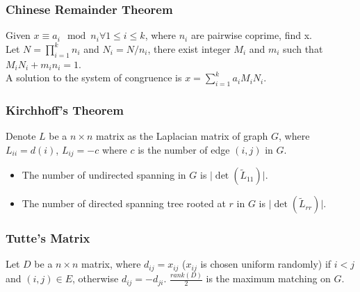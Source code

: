 \subsubsection{Chinese Remainder Theorem}
Given $x \equiv a_i \mod n_i \forall 1 \leq i \leq k$, where $n_i$ are pairwise coprime, find x. \\
Let $N = \prod_{i = 1}^{k}{n_i}$ and $N_i = N / n_i$, there exist integer $M_i$ and $m_i$ such that $M_iN_i + m_in_i = 1$. \\
A solution to the system of congruence is $x = \sum_{i = 1}^{k}{a_iM_iN_i}$. 

\subsubsection{Kirchhoff's Theorem}
Denote $L$ be a $n \times n$ matrix as the Laplacian matrix of graph $G$, where $L_{ii} = d(i)$, $L_{ij} = -c$ where $c$ is the number of edge $(i, j)$ in $G$.
\begin{itemize}
    \item The number of undirected spanning in $G$ is $\lvert \det(\tilde{L}_{11}) \rvert$.
    \item The number of directed spanning tree rooted at $r$ in $G$ is $\lvert \det(\tilde{L}_{rr}) \rvert$.
\end{itemize}

\subsubsection{Tutte's Matrix}
Let $D$ be a $n \times n$ matrix, where $d_{ij} = x_{ij}$ ($x_{ij}$ is chosen uniform randomly) if $i < j$ and $(i, j) \in E$, otherwise $d_{ij} = -d_{ji}$. $\frac{rank(D)}{2}$ is the maximum matching on $G$.
